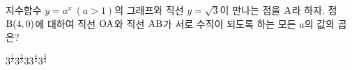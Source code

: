 지수함수 $y=a^x\ (a>1)$의 그래프와 직선 $y=\sqrt{3}$이 만나는 점을 $\mathrm{A}$라 하자. 점~$\mathrm{B}(4{,}\mkern3mu\mathopen{}0)$에 대하여 직선 $\mathrm{OA}$와 직선 $\mathrm{AB}$가 서로 수직이 되도록 하는 모든 $a$의 값의 곱은? 
\begin{choices32}{$3^{\frac{1}{3}}$}{$3^{\frac{2}{3}}$}{$3$}{$3^{\frac{4}{3}}$}{$3^{\frac{5}{3}}$}\end{choices32}
